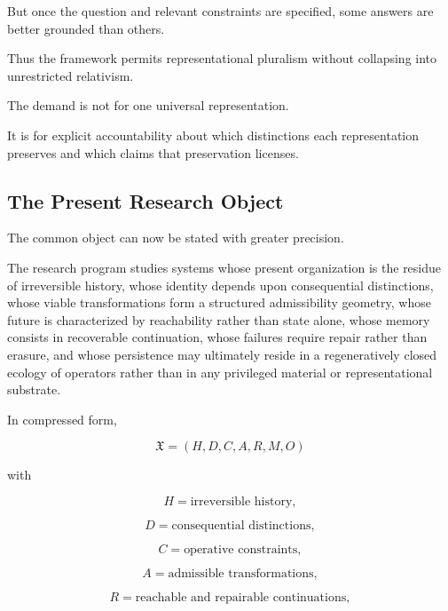 \documentclass[11pt]{article}
\theoremstyle{remark}
\begin{document}
But once the question and relevant constraints are specified, some answers are better grounded than others.

Thus the framework permits representational pluralism without collapsing into unrestricted relativism.

The demand is not for one universal representation.

It is for explicit accountability about which distinctions each representation preserves and which claims that preservation licenses.

\subsection{The Present Research Object}

The common object can now be stated with greater precision.

The research program studies systems whose present organization is the residue of irreversible history, whose identity depends upon consequential distinctions, whose viable transformations form a structured admissibility geometry, whose future is characterized by reachability rather than state alone, whose memory consists in recoverable continuation, whose failures require repair rather than erasure, and whose persistence may ultimately reside in a regeneratively closed ecology of operators rather than in any privileged material or representational substrate.

In compressed form,

\begin{equation}
\boxed{
\mathfrak{X}
=
(
H,
D,
C,
A,
R,
M,
O
)
}
\end{equation}

with

\begin{equation}
H
=
\text{irreversible history},
\end{equation}

\begin{equation}
D
=
\text{consequential distinctions},
\end{equation}

\begin{equation}
C
=
\text{operative constraints},
\end{equation}

\begin{equation}
A
=
\text{admissible transformations},
\end{equation}

\begin{equation}
R
=
\text{reachable and repairable continuations},
\end{equation}
\end{document}
